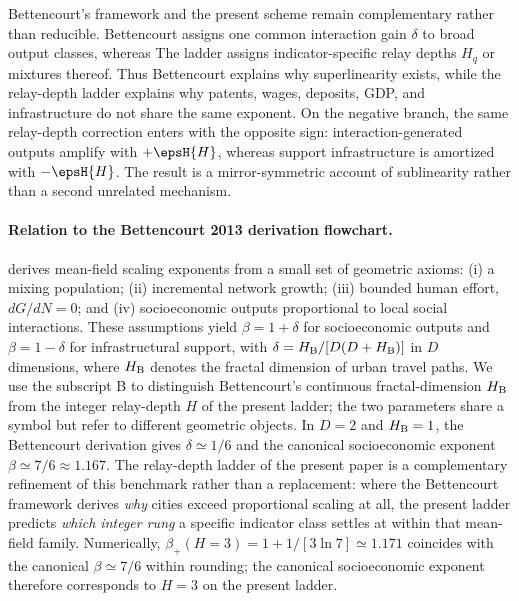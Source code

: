 Bettencourt's framework and the present scheme remain complementary rather than reducible. Bettencourt
assigns one common interaction gain $\delta$ to broad output classes, whereas
The ladder assigns indicator-specific relay depths $H_q$ or mixtures thereof. Thus
Bettencourt explains why superlinearity exists, while the relay-depth ladder explains why patents,
wages, deposits, GDP, and infrastructure do not share the same exponent. On the
negative branch, the same relay-depth correction enters with the opposite sign:
interaction-generated outputs amplify with $+\epsH{H}$, whereas support
infrastructure is amortized with $-\epsH{H}$. The result is a mirror-symmetric
account of sublinearity rather than a second unrelated mechanism.

\paragraph{Relation to the Bettencourt 2013 derivation flowchart.}
\citet{Bettencourt2013} derives mean-field scaling exponents
from a small set of geometric axioms: (i) a mixing population; (ii) incremental
network growth; (iii) bounded human effort, $dG/dN=0$; and
(iv) socioeconomic outputs proportional to local social interactions.
These assumptions yield $\beta=1+\delta$ for socioeconomic outputs and
$\beta=1-\delta$ for infrastructural support, with
$\delta=H_{\rm B}/[D(D+H_{\rm B})]$ in $D$ dimensions, where $H_{\rm B}$
denotes the fractal dimension of urban travel paths. We use the subscript
B to distinguish Bettencourt's continuous fractal-dimension $H_{\rm B}$
from the integer relay-depth $H$ of the present ladder; the two parameters
share a symbol but refer to different geometric objects.
In $D=2$ and $H_{\rm B}=1$, the Bettencourt derivation gives
$\delta\simeq 1/6$ and the canonical socioeconomic exponent
$\beta\simeq 7/6\approx 1.167$.
The relay-depth ladder of the present paper is a complementary refinement
of this benchmark rather than a replacement: where the Bettencourt
framework derives \emph{why} cities exceed proportional scaling at all,
the present ladder predicts \emph{which integer rung} a specific
indicator class settles at within that mean-field family.
Numerically, $\beta_+(H{=}3)=1+1/[3\ln 7]\simeq 1.171$ coincides with the
canonical $\beta\simeq 7/6$ within rounding; the canonical socioeconomic
exponent therefore corresponds to $H{=}3$ on the present ladder.

